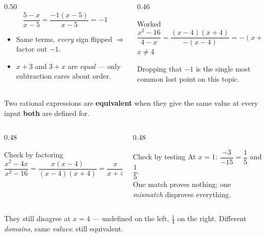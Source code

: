 \documentclass[aspectratio=169, 11pt]{beamer}
\begin{document}
\begin{frame}[t, plain]
  \begin{columns}[T]
    \begin{column}{0.50\textwidth}
      \[ \frac{5-x}{x-5}=\frac{-1(x-5)}{x-5}=-1 \]
      \begin{itemize}\setlength{\itemsep}{4pt}
        \item Same terms, \emph{every} sign flipped $\Rightarrow$ factor out $-1$.
        \item $x+3$ and $3+x$ are \emph{equal} --- only subtraction cares about order.
      \end{itemize}
    \end{column}
    \begin{column}{0.46\textwidth}
      \begin{block}{Worked}
        \[ \frac{x^2-16}{4-x}=\frac{(x-4)(x+4)}{-(x-4)}=-(x+4) \]
        \centering $x\neq4$
      \end{block}
      \vspace{3pt}
      {\footnotesize Dropping that $-1$ is the single most common lost point on this topic.}
    \end{column}
  \end{columns}
\end{frame}

\begin{frame}[t, plain]
  \begin{center}
    Two rational expressions are \textbf{equivalent} when they give the same value at every input
    \textbf{both} are defined for.
  \end{center}
  \vspace{4pt}
  \begin{columns}[T]
    \begin{column}{0.48\textwidth}
      \begin{block}{Check by factoring}
        $\dfrac{x^2-4x}{x^2-16}=\dfrac{x(x-4)}{(x-4)(x+4)}=\dfrac{x}{x+4}$
      \end{block}
    \end{column}
    \begin{column}{0.48\textwidth}
      \begin{block}{Check by testing}
        At $x=1$: \; $\dfrac{-3}{-15}=\dfrac15$ \; and \; $\dfrac{1}{5}$. \\[3pt]
        One match proves nothing; one \emph{mismatch} disproves everything.
      \end{block}
    \end{column}
  \end{columns}
  \vspace{5pt}
  \begin{center}\footnotesize
    They still disagree at $x=4$ --- undefined on the left, $\tfrac14$ on the right. Different
    \emph{domains}, same \emph{values}: still equivalent.
  \end{center}
\end{frame}
\end{document}

